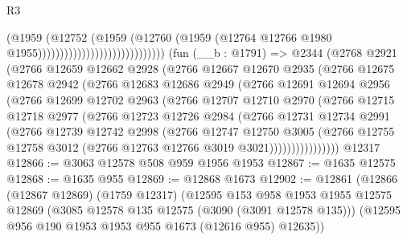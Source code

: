 \begin{lexlean}{R3}
\begin{coremodule}
                                                  (@1959
                                                    (@12752
                                                      (@1959
                                                        (@12760
                                                          (@1959
                                                            (@12764
                                                              @12766
                                                              @1980
                                                              @1955)))))))))))))))))))))))))))))
    (fun (__b : @1791) =>
    @2344
      (@2768
        @2921
        (@2766
          @12659
          @12662
          @2928
          (@2766
            @12667
            @12670
            @2935
            (@2766
              @12675
              @12678
              @2942
              (@2766
                @12683
                @12686
                @2949
                (@2766
                  @12691
                  @12694
                  @2956
                  (@2766
                    @12699
                    @12702
                    @2963
                    (@2766
                      @12707
                      @12710
                      @2970
                      (@2766
                        @12715
                        @12718
                        @2977
                        (@2766
                          @12723
                          @12726
                          @2984
                          (@2766
                            @12731
                            @12734
                            @2991
                            (@2766
                              @12739
                              @12742
                              @2998
                              (@2766
                                @12747
                                @12750
                                @3005
                                (@2766
                                  @12755
                                  @12758
                                  @3012
                                  (@2766 @12763 @12766 @3019 @3021))))))))))))))))
    @12317
@12866 := @3063 @12578 @508 @959 @1956 @1953
@12867 := @1635 @12575
@12868 := @1635 @955
@12869 := @12868 @1673
@12902 := @12861
    (@12866
      (@12867 @12869)
      (@1759 @12317)
      (@12595
        @153
        @958
        @1953
        @1955
        @12575
        @12869
        (@3085 @12578 @135 @12575 (@3090 (@3091 @12578 @135)))
        (@12595 @956 @190 @1953 @1953 @955 @1673 (@12616 @955) @12635))

\end{coremodule}
\end{lexlean}
